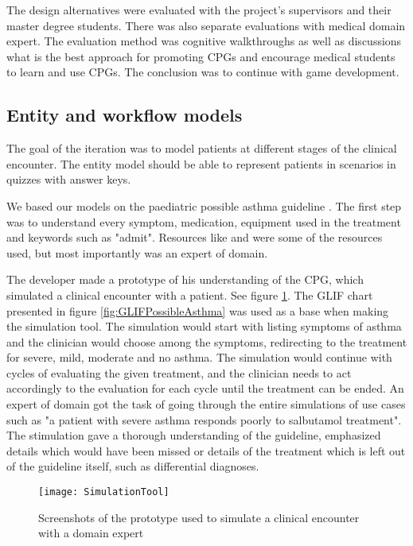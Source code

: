 The design alternatives were evaluated with the project's supervisors and their master degree students. There was also separate evaluations with medical domain expert. The evaluation method was cognitive walkthroughs as well as discussions what is the best approach for promoting CPGs and encourage medical students to learn and use CPGs. The conclusion was to continue with game development. 


\subsection {Entity and workflow models}
The goal of the iteration was to model patients at different stages of the clinical encounter. The entity model should be able to represent patients in scenarios in quizzes with answer keys.

We based our models on the paediatric possible asthma guideline \parencite{RepublicofKeny2016}. The first step was to understand every symptom, medication, equipment used in the treatment and keywords such as "admit". Resources like \textcite{Disease2011} and \textcite{Johansen2018} were some of the resources used, but most importantly was an expert of domain. 

The developer made a prototype of his understanding of the CPG, which simulated a clinical encounter with a patient. See figure \ref{fig:SimulationTool}. The GLIF chart presented in figure \ref{fig:GLIFPossibleAsthma} was used as a base when making the simulation tool. The simulation would start with listing symptoms of asthma and the clinician would choose among the symptoms, redirecting to the treatment for severe, mild, moderate and no asthma. The simulation would continue with cycles of evaluating the given treatment, and the clinician needs to act accordingly to the evaluation for each cycle until the treatment can be ended. An expert of domain got the task of going through the entire simulations of use cases such as "a patient with severe asthma responds poorly to salbutamol treatment". The stimulation gave a thorough understanding of the guideline, emphasized details which would have been missed or details of the treatment which is left out of the guideline itself, such as differential diagnoses.

\begin{figure}[h!]
	\texttt{[image: SimulationTool]}
	\caption {Screenshots of the prototype used to simulate a clinical encounter with a domain expert}
	\label{fig:SimulationTool}
\end{figure}

